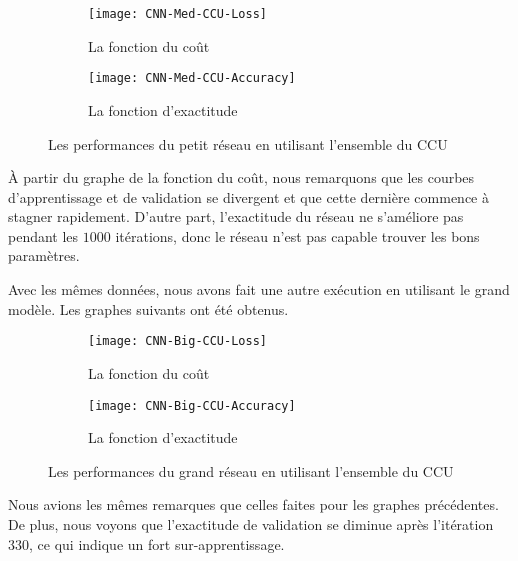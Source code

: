 \begin{figure}[h]
\centering
\begin{subfigure}{0.8\textwidth}
  \texttt{[image: CNN-Med-CCU-Loss]}
  \caption{La fonction du coût}
\end{subfigure}
\begin{subfigure}{0.8\textwidth}
  \texttt{[image: CNN-Med-CCU-Accuracy]}
  \caption{La fonction d'exactitude}
\end{subfigure}
\caption{Les performances du petit réseau en utilisant l'ensemble du CCU}
\end{figure}

\`A partir du graphe de la fonction du coût, nous remarquons que les courbes
d'apprentissage et de validation se divergent et que cette dernière commence
à stagner rapidement. D'autre part, l'exactitude du réseau ne s'améliore pas
pendant les $1000$ itérations, donc le réseau n'est pas capable trouver les bons
paramètres.

Avec les mêmes données, nous avons fait une autre exécution en utilisant le grand
modèle. Les graphes suivants ont été obtenus.

\begin{figure}[h]
\centering
\begin{subfigure}{0.8\textwidth}
  \texttt{[image: CNN-Big-CCU-Loss]}
  \caption{La fonction du coût}
\end{subfigure}
\begin{subfigure}{0.8\textwidth}
  \texttt{[image: CNN-Big-CCU-Accuracy]}
  \caption{La fonction d'exactitude}
\end{subfigure}
\caption{Les performances du grand réseau en utilisant l'ensemble du CCU}
\end{figure}

Nous avions les mêmes remarques que celles faites pour les graphes précédentes.
De plus, nous voyons que l'exactitude de validation se diminue après l'itération
$330$, ce qui indique un fort sur-apprentissage.
